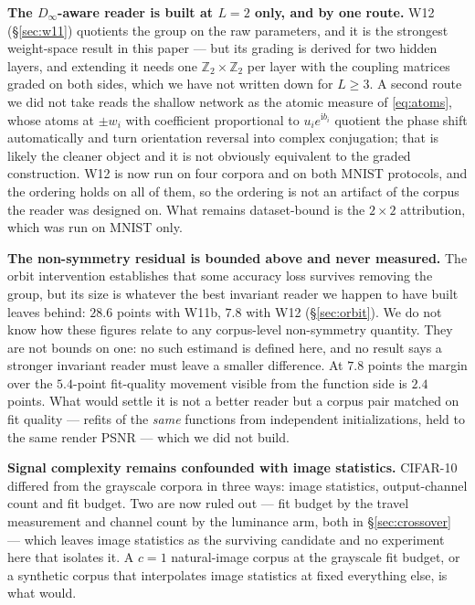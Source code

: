 \documentclass[10pt,twocolumn,letterpaper]{article}
\theoremstyle{definition}
\newcommand{\Z}{\mathbb{Z}}
\newcommand{\Dinf}{D_\infty}
\begin{document}
\textbf{The $\Dinf$-aware reader is built at $L=2$ only, and by one route.} W12
(\S\ref{sec:w11}) quotients the group on the raw parameters, and it is the strongest weight-space
result in this paper --- but its grading is derived for two hidden layers, and extending it needs
one $\Z_2\times\Z_2$ per layer with the coupling matrices graded on both sides, which we have not
written down for $L\ge3$. A second route we did not take reads the shallow network as the atomic
measure of \eqref{eq:atoms}, whose atoms at $\pm w_i$ with coefficient proportional to
$u_i e^{\mathrm i b_i}$ quotient the phase shift automatically and turn orientation reversal into
complex conjugation; that is likely the cleaner object and it is not obviously equivalent to the
graded construction. W12 is now run on four corpora and on both MNIST protocols, and the ordering
holds on all of them, so the ordering is not an artifact of the corpus the reader was designed on. What remains dataset-bound is the $2\times2$ attribution, which was run on MNIST only.

\textbf{The non-symmetry residual is bounded above and never measured.} The orbit intervention
establishes that some accuracy loss survives removing the group, but its size is whatever the best
invariant reader we happen to have built leaves behind: $28.6$ points with W11b, $7.8$ with W12
(\S\ref{sec:orbit}). We do not know how these figures relate to any corpus-level non-symmetry
quantity. They are not bounds on one: no such estimand is defined here, and no result says a
stronger invariant reader must leave a smaller difference. At $7.8$ points the margin over the
$5.4$-point fit-quality movement visible from the function side is $2.4$ points. What would settle
it is not a better reader but a corpus pair matched on fit quality --- refits of the \emph{same}
functions from independent initializations, held to the same render PSNR --- which we did not build.

\textbf{Signal complexity remains confounded with image statistics.} CIFAR-10 differed from the
grayscale corpora in three ways: image statistics, output-channel count and fit budget. Two are now
ruled out --- fit budget by the travel measurement and channel count by the luminance arm, both in
\S\ref{sec:crossover} --- which leaves image statistics as the surviving candidate and no
experiment here that isolates it. A $c=1$ natural-image corpus at the grayscale fit budget, or a
synthetic corpus that interpolates image statistics at fixed everything else, is what would.
\end{document}
